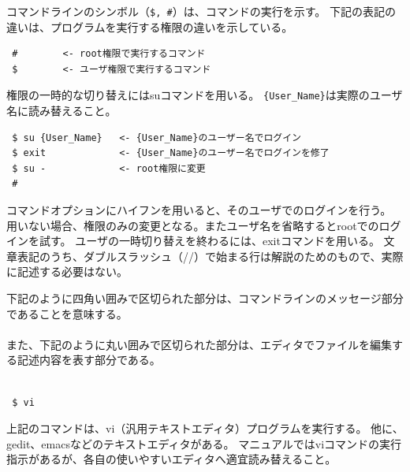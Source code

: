 コマンドラインのシンボル（\verb|$, #|）は、コマンドの実行を示す。
下記の表記の違いは、プログラムを実行する権限の違いを示している。

\begin{verbatim}
 #        <- root権限で実行するコマンド
 $        <- ユーザ権限で実行するコマンド
\end{verbatim}
権限の一時的な切り替えにはsuコマンドを用いる。
\verb|{User_Name}|は実際のユーザ名に読み替えること。
\begin{verbatim}
 $ su {User_Name}   <- {User_Name}のユーザー名でログイン
 $ exit             <- {User_Name}のユーザー名でログインを修了
 $ su -             <- root権限に変更
 #
\end{verbatim}

コマンドオプションにハイフンを用いると、そのユーザでのログインを行う。
用いない場合、権限のみの変更となる。またユーザ名を省略するとrootでのログインを試す。
ユーザの一時切り替えを終わるには、exitコマンドを用いる。
文章表記のうち、ダブルスラッシュ（//）で始まる行は解説のためのもので、実際に記述する必要はない。

下記のように四角い囲みで区切られた部分は、コマンドラインのメッセージ部分であることを意味する。\\
{\small {\gt
{}}}\\

また、下記のように丸い囲みで区切られた部分は、エディタでファイルを編集する記述内容を表す部分である。\\
{\small {\gt
{}}}\\


\begin{verbatim}
 $ vi
\end{verbatim}

上記のコマンドは、vi（汎用テキストエディタ）プログラムを実行する。
他に、gedit、emacsなどのテキストエディタがある。
マニュアルではviコマンドの実行指示があるが、各自の使いやすいエディタへ適宜読み替えること。
